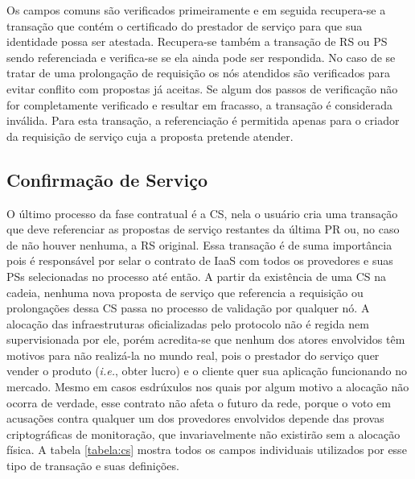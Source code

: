 Os campos comuns são verificados primeiramente e em seguida recupera-se a transação que contém o certificado do prestador de serviço para que sua identidade possa ser atestada. Recupera-se também a transação de \ac{RS} ou \ac{PS} sendo referenciada e verifica-se se ela ainda pode ser respondida. No caso de se tratar de uma prolongação de requisição os nós atendidos são verificados para evitar conflito com propostas já aceitas. Se algum dos passos de verificação não for completamente verificado e resultar em fracasso, a transação é considerada inválida. Para esta transação, a referenciação é permitida apenas para o criador da requisição de serviço cuja a proposta pretende atender.

\subsection{Confirmação de Serviço}
\label{subsec:proposta:contratual:cs}

O último processo da fase contratual é a \ac{CS}, nela o usuário cria uma transação que deve referenciar as propostas de serviço restantes da última \ac{PR} ou, no caso de não houver nenhuma, a \ac{RS} original. Essa transação é de suma importância pois é responsável por selar o contrato de \ac{IaaS} com todos os provedores e suas \acp{PS} selecionadas no processo até então. A partir da existência de uma \ac{CS} na cadeia, nenhuma nova proposta de serviço que referencia a requisição ou prolongações dessa \ac{CS} passa no processo de validação por qualquer nó. A alocação das infraestruturas oficializadas pelo protocolo não é regida nem supervisionada por ele, porém acredita-se que nenhum dos atores envolvidos têm motivos para não realizá-la no mundo real, pois o prestador do serviço quer vender o produto (\textit{i.e.}, obter lucro) e o cliente quer sua aplicação funcionando no mercado. Mesmo em casos esdrúxulos nos quais por algum motivo a alocação não ocorra de verdade, esse contrato não afeta o futuro da rede, porque o voto em acusações contra qualquer um dos provedores envolvidos depende das provas criptográficas de monitoração, que invariavelmente não existirão sem a alocação física. A tabela \ref{tabela:cs} mostra todos os campos individuais utilizados por esse tipo de transação e suas definições. 

